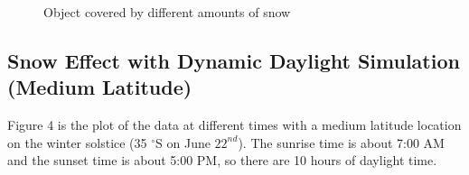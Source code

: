 \documentclass{article}
\begin{document}
\begin{figure}[h]
  \centering
  \caption{Object covered by different amounts of snow}
  \label{fig:PureSnow}
\end{figure}

\subsection {Snow Effect with Dynamic Daylight Simulation (Medium Latitude)}

Figure 4 is the plot of the data at different times with a medium latitude location on the winter solstice (35 $^{\circ}$S on June 
\(22^{nd}\)). The sunrise time is about 7:00 AM and the sunset time is about 5:00 PM, so there are 10 hours of daylight time.
\end{document}
